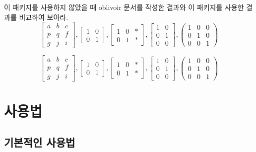 \documentclass[a4paper,amsmath]{oblivoir}
\newcommand\pkg[1]{\textsf{#1}}
\begin{document}
이 패키지를 사용하지 않았을 때 \pkg{oblivoir} 문서를 작성한 결과와 이 패키지를 사용한 결과를 비교하여 보아라.
\[
    \begin{bmatrix} a & b & c \\ p & q & f \\ g & j & i \end{bmatrix}, 
    \begin{bmatrix} 1 & 0 \\ 0 & 1\end{bmatrix},
    \begin{bmatrix} 1 & 0 & \ast\! \\ 0 & 1 & \ast\! \end{bmatrix},
    \begin{bmatrix} 1 & 0 \\ 0 & 1 \\ 0 & 0 \end{bmatrix},
    \begin{pmatrix} 1 & 0 & 0 \\ 0 & 1 & 0 \\ 0 & 0 & 1 \end{pmatrix}
\]
\begin{obMathLeading}
\[ 
    \begin{bmatrix} a & b & c \\ p & q & f \\ g & j & i \end{bmatrix}, 
    \begin{bmatrix} 1 & 0 \\ 0 & 1\end{bmatrix},
    \begin{bmatrix} 1 & 0 & \ast\! \\ 0 & 1 & \ast\! \end{bmatrix},
    \begin{bmatrix} 1 & 0 \\ 0 & 1 \\ 0 & 0 \end{bmatrix},
    \begin{pmatrix} 1 & 0 & 0 \\ 0 & 1 & 0 \\ 0 & 0 & 1 \end{pmatrix}
\]
\end{obMathLeading}

\section{사용법}

\subsection{기본적인 사용법}
\end{document}
